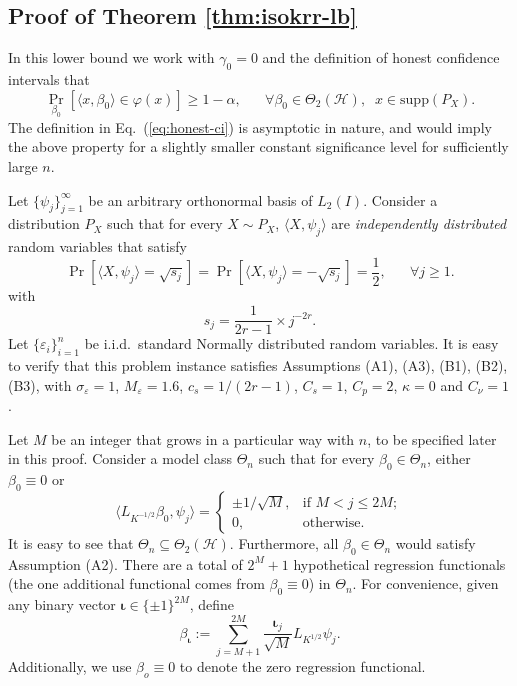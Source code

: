 \documentclass[aos]{imsart}
\newcommand{\vct}{\boldsymbol}
\newcommand{\supp}{\mathrm{supp}}
\newcommand{\mH}{\mathcal H}
\newcommand{\pd}[1]{%
	{ \color{blue} PD: #1}%
}
\theoremstyle{plain}
\theoremstyle{definition}
\theoremstyle{definition}
\begin{document}
\begin{appendix}


\subsection{Proof of Theorem \ref{thm:isokrr-lb}}

In this lower bound we work with $\gamma_0=0$ and the definition of honest confidence intervals that
$$
\Pr_{\beta_0}[\langle x,\beta_0\rangle\in\varphi(x)] \geq 1-\alpha,\;\;\;\;\;\;\forall \beta_0\in\Theta_2(\mH),\;\;x\in\supp(P_X).
$$
The definition in Eq.~(\ref{eq:honest-ci}) is asymptotic in nature, and would imply the above property for a slightly smaller constant significance level for sufficiently large $n$.

Let $\{\psi_j\}_{j=1}^{\infty}$ be an arbitrary orthonormal basis of $L_2(I)$.
Consider a distribution $P_X$ such that for every $X\sim P_X$, $\langle X,\psi_j\rangle$ are \emph{independently distributed} random variables that satisfy
$$
\Pr[\langle X,\psi_j\rangle = \sqrt{s_j}] = \Pr[\langle X,\psi_j\rangle = -\sqrt{s_j}] = \frac{1}{2},\;\;\;\;\;\;\forall j\geq 1.
$$
with
$$
s_j = \frac{1}{2r-1}\times j^{-2r}.
$$
Let $\{\varepsilon_i\}_{i=1}^n$ be i.i.d.~standard Normally distributed random variables. It is easy to verify that this problem instance satisfies Assumptions (A1), (A3), (B1), (B2), (B3),
with $\sigma_\varepsilon=1$, $M_\varepsilon=1.6$, $c_s=1/(2r-1)$, $C_s=1$, $C_p=2$, $\kappa=0$ and $C_\nu=1$.

Let $M$ be an integer that grows in a particular way with $n$, to be specified later in this proof. 
Consider a model class $\Theta_n$ such that for every $\beta_0\in\Theta_n$, either $\beta_0\equiv 0$ or
$$
\langle L_{K^{-1/2}}\beta_0, \psi_j\rangle = \left\{\begin{array}{ll} \pm 1/\sqrt{M},& \text{if }M< j\leq 2M;\\ 0,& \text{otherwise}.\end{array}\right.
$$
It is easy to see that $\Theta_n\subseteq\Theta_2(\mH)$. Furthermore, all $\beta_0\in\Theta_n$ would satisfy Assumption (A2).
There are a total of $2^M+1$ hypothetical regression functionals (the one additional functional comes from $\beta_0\equiv 0$) in $\Theta_n$.
For convenience, given any binary vector $\vct\iota\in\{\pm 1\}^{2M}$, define
$$
\beta_{\vct\iota} := \sum_{j=M+1}^{2M}\frac{\vct\iota_j}{\sqrt{M}} L_{K^{1/2}}\psi_j.
$$
Additionally, we use $\beta_o\equiv 0$ to denote the zero regression functional.


\end{appendix}
\end{document}
